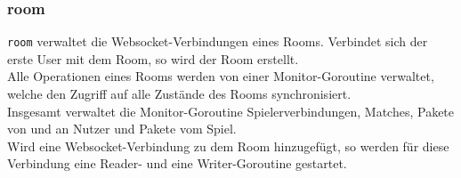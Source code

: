 \subsubsection{room}
\verb+room+ verwaltet die Websocket-Verbindungen eines Rooms. Verbindet sich der erste User mit dem Room, so wird der Room erstellt. \\
Alle Operationen eines Rooms werden von einer Monitor-Goroutine verwaltet, welche den Zugriff auf alle Zustände des Rooms synchronisiert. \\
Insgesamt verwaltet die Monitor-Goroutine Spielerverbindungen, Matches, Pakete von und an Nutzer und Pakete vom Spiel. \\
Wird eine Websocket-Verbindung zu dem Room hinzugefügt, so werden für diese Verbindung eine Reader- und eine Writer-Goroutine gestartet. 

